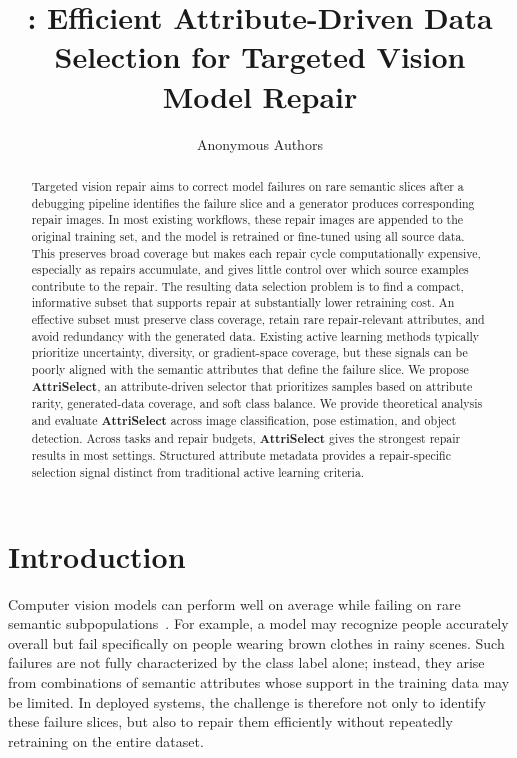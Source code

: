 \documentclass[10pt,twocolumn,letterpaper]{article}
\title{\modelplain: Efficient Attribute-Driven Data Selection for Targeted Vision Model Repair}
\author{%
  Anonymous Authors
}
\newcommand{\modelname}{AttriSelect}
\newcommand{\model}{\textcolor{darkteal}{\textbf{\modelname}}\xspace}
\begin{document}
\maketitle

\begin{abstract}
Targeted vision repair aims to correct model failures on rare semantic slices after a debugging pipeline identifies the failure slice and a generator produces corresponding repair images. In most existing workflows, these repair images are appended to the original training set, and the model is retrained or fine-tuned using all source data. This preserves broad coverage but makes each repair cycle computationally expensive, especially as repairs accumulate, and gives little control over which source examples contribute to the repair. The resulting data selection problem is to find a compact, informative subset that supports repair at substantially lower retraining cost. An effective subset must preserve class coverage, retain rare repair-relevant attributes, and avoid redundancy with the generated data. Existing active learning methods typically prioritize uncertainty, diversity, or gradient-space coverage, but these signals can be poorly aligned with the semantic attributes that define the failure slice. We propose \textbf{\model}, an attribute-driven selector that prioritizes samples based on attribute rarity, generated-data coverage, and soft class balance. We provide theoretical analysis and evaluate \model across image classification, pose estimation, and object detection. Across tasks and repair budgets, \model gives the strongest repair results in most settings. Structured attribute metadata provides a repair-specific selection signal distinct from traditional active learning criteria.
\end{abstract}

\section{Introduction}

Computer vision models can perform well on average while failing on rare semantic subpopulations~\citep{eyuboglu2022domino,chen2023hibug}. For example, a model may recognize people accurately overall but fail specifically on people wearing brown clothes in rainy scenes. Such failures are not fully characterized by the class label alone; instead, they arise from combinations of semantic attributes whose support in the training data may be limited. In deployed systems, the challenge is therefore not only to identify these failure slices, but also to repair them efficiently without repeatedly retraining on the entire dataset.
\end{document}
